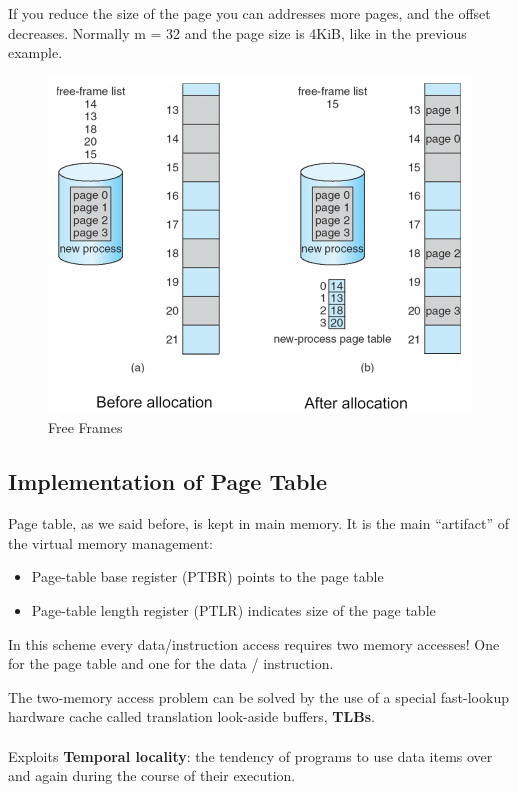 If you reduce the size of the page you can addresses more pages, and the offset decreases. Normally m = 32 and the page size is 4KiB, like in the previous example.


\begin{figure}[htbp]
    \centering
    \includegraphics[width=0.7\linewidth]{img/yrtjn.png}
    \caption{Free Frames}
\end{figure}


\subsection{Implementation of Page Table}
Page table, as we said before, is kept in main memory. It is the main “artifact” of the virtual memory management:

\begin{itemize}
    \item[] Page-table base register (PTBR) points to the page table
    \item[] Page-table length register (PTLR) indicates size of the page table
\end{itemize}

In this scheme every data/instruction access requires two memory accesses! One for the page table and one for the data / instruction.

The two-memory access problem can be solved by the use of a special fast-lookup hardware cache called translation look-aside buffers, \textbf{TLBs}.

\paragraph{}
Exploits \textbf{Temporal locality}: the tendency of programs to use data items over and again during
the course of their execution.

